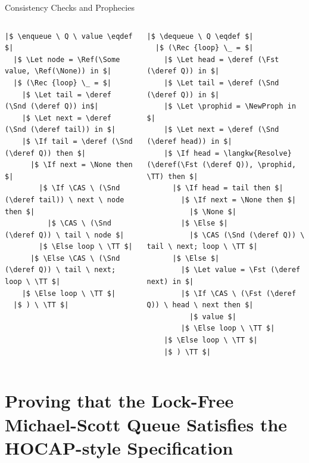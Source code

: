 \documentclass[9pt,xcolor={dvipsnames}]{beamer}
\newcommand{\enqueue}{\operatorname{enqueue}}
\newcommand{\dequeue}{\operatorname{dequeue}}
\begin{document}
\begin{frame}[fragile]{Consistency Checks and Prophecies}
\begin{columns}[t]
\begin{column}{0.5\textwidth}
\begin{verbatim}
|$ \enqueue \ Q \ value \eqdef $|
  |$ \Let node = \Ref(\Some value, \Ref(\None)) in $|
  |$ (\Rec {loop} \_ = $|
    |$ \Let tail = \deref (\Snd (\deref Q)) in$|
    |$ \Let next = \deref (\Snd (\deref tail)) in $|
    |$ \If tail = \deref (\Snd (\deref Q)) then $|
      |$ \If next = \None then $|
        |$ \If \CAS \ (\Snd (\deref tail)) \ next \ node then $|
          |$ \CAS \ (\Snd (\deref Q)) \ tail \ node $|
        |$ \Else loop \ \TT $|
      |$ \Else \CAS \ (\Snd (\deref Q)) \ tail \ next; loop \ \TT $|
    |$ \Else loop \ \TT $|
  |$ ) \ \TT $|
      \end{verbatim}
    \end{column}
    \begin{column}{0.5\textwidth}
      \begin{verbatim}
|$ \dequeue \ Q \eqdef $|
  |$ (\Rec {loop} \_ = $|
    |$ \Let head = \deref (\Fst (\deref Q)) in $|
    |$ \Let tail = \deref (\Snd (\deref Q)) in $|
    |$ \Let \prophid = \NewProph in $|
    |$ \Let next = \deref (\Snd (\deref head)) in $|
    |$ \If head = \langkw{Resolve} (\deref(\Fst (\deref Q)), \prophid, \TT) then $|
      |$ \If head = tail then $|
        |$ \If next = \None then $|
          |$ \None $|
        |$ \Else $|
          |$ \CAS (\Snd (\deref Q)) \ tail \ next; loop \ \TT $|
      |$ \Else $|
        |$ \Let value = \Fst (\deref next) in $|
        |$ \If \CAS \ (\Fst (\deref Q)) \ head \ next then $|
          |$ value $|
        |$ \Else loop \ \TT $|
    |$ \Else loop \ \TT $|
    |$ ) \TT $|
        \end{verbatim}
    \end{column}
  \end{columns}
\end{frame}


\section{Proving that the Lock-Free Michael-Scott Queue Satisfies the HOCAP-style Specification}
\end{document}
